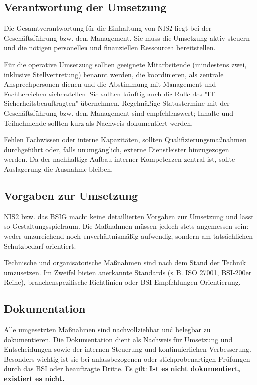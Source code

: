 \subsection{Verantwortung der Umsetzung}

Die Gesamtverantwortung für die Einhaltung von NIS2 liegt bei der Geschäftsführung bzw. dem Management. Sie muss die Umsetzung aktiv steuern und die nötigen personellen und finanziellen Ressourcen bereitstellen.

Für die operative Umsetzung sollten geeignete Mitarbeitende (mindestens zwei, inklusive Stellvertretung) benannt werden, die koordinieren, als zentrale Ansprechpersonen dienen und die Abstimmung mit Management und Fachbereichen sicherstellen. Sie sollten künftig auch die Rolle des "IT-Sicherheitsbeauftragten" übernehmen. Regelmäßige Statustermine mit der Geschäftsführung bzw. dem Management sind empfehlenswert; Inhalte und Teilnehmende sollten kurz als Nachweis dokumentiert werden.

Fehlen Fachwissen oder interne Kapazitäten, sollten Qualifizierungsmaßnahmen durchgeführt oder, falls unumgänglich, externe Dienstleister hinzugezogen werden. Da der nachhaltige Aufbau interner Kompetenzen zentral ist, sollte Auslagerung die Ausnahme bleiben.


\subsection{Vorgaben zur Umsetzung}
NIS2 bzw. das BSIG macht keine detaillierten Vorgaben zur Umsetzung und lässt so Gestaltungsspielraum. Die Maßnahmen müssen jedoch stets angemessen sein: weder unzureichend noch unverhältnismäßig aufwendig, sondern am tatsächlichen Schutzbedarf orientiert.

Technische und organisatorische Maßnahmen sind nach dem Stand der Technik umzusetzen. Im Zweifel bieten anerkannte Standards (z.\,B. ISO 27001, BSI-200er Reihe), branchenspezifische Richtlinien oder BSI-Empfehlungen Orientierung.
\newpage
\subsection{Dokumentation}
Alle umgesetzten Maßnahmen sind nachvollziehbar und belegbar zu dokumentieren. Die Dokumentation dient als Nachweis für Umsetzung und Entscheidungen sowie der internen Steuerung und kontinuierlichen Verbesserung. Besonders wichtig ist sie bei anlassbezogenen oder stichprobenartigen Prüfungen durch das BSI oder beauftragte Dritte. Es gilt: \textbf{Ist es nicht dokumentiert, existiert es nicht.}

